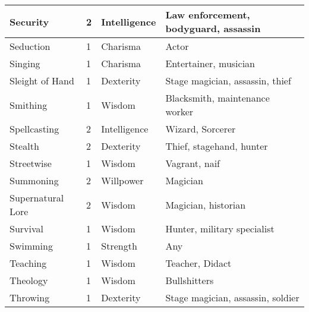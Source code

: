 \documentclass[twoside]{book}
\begin{document}
\begin{longtable}{p{1.25in}llp{12em}}
  \raggedright
           Security 
  &
   2 
  &
   Intelligence 
  &
   Law enforcement,
           bodyguard, assassin 
  \tabularnewline
  \hline
      
  \raggedright
           Seduction 
  &
   1 
  &
   Charisma 
  &
   Actor 
  \tabularnewline
  \hline
      
  \raggedright
           Singing 
  &
   1 
  &
   Charisma 
  &
   Entertainer, musician
           
  \tabularnewline
  \hline
      
  \raggedright
           Sleight of Hand 
  &
   1 
  &
   Dexterity 
  &
   Stage magician, assassin,
           thief 
  \tabularnewline
  \hline
      
  \raggedright
           Smithing 
  &
   1 
  &
   Wisdom 
  &
   Blacksmith, maintenance
           worker 
  \tabularnewline
  \hline
      
  \raggedright
           Spellcasting 
  &
   2 
  &
   Intelligence 
  &
   Wizard, Sorcerer 
  \tabularnewline
  \hline
      
  \raggedright
           Stealth 
  &
   2 
  &
   Dexterity 
  &
   Thief, stagehand, hunter
           
  \tabularnewline
  \hline
      
  \raggedright
           Streetwise 
  &
   1 
  &
   Wisdom 
  &
   Vagrant, naif 
  \tabularnewline
  \hline
      
  \raggedright
           Summoning 
  &
   2 
  &
   Willpower 
  &
   Magician 
  \tabularnewline
  \hline
      
  \raggedright
           Supernatural Lore 
  &
   2 
  &
   Wisdom 
  &
   Magician, historian
           
  \tabularnewline
  \hline
      
  \raggedright
           Survival 
  &
   1 
  &
   Wisdom 
  &
   Hunter, military
           specialist 
  \tabularnewline
  \hline
      
  \raggedright
           Swimming 
  &
   1 
  &
   Strength 
  &
   Any 
  \tabularnewline
  \hline
      
  \raggedright
           Teaching 
  &
   1 
  &
   Wisdom 
  &
   Teacher, Didact 
  \tabularnewline
  \hline
      
  \raggedright
           Theology 
  &
   1 
  &
   Wisdom 
  &
   Bullshitters 
  \tabularnewline
  \hline
      
  \raggedright
           Throwing 
  &
   1 
  &
   Dexterity 
  &
   Stage magician, assassin,
           soldier 
  \tabularnewline
  \hline
      

\end{longtable}
\end{document}
